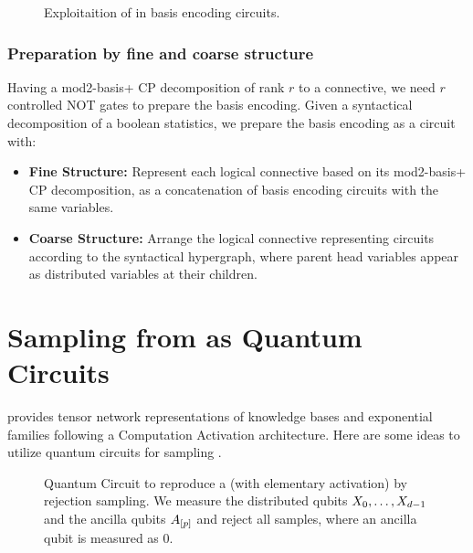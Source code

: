 \documentclass[aps,onecolumn,nofootinbib,pra]{article}
\begin{document}
    \begin{figure}
        \begin{center}
            
        \end{center}
        \caption{
           Exploitaition of \PolynomialSparsity{} in basis encoding circuits.
        }\label{fig:qcbencodingPolynomial}
    \end{figure}


    \subsubsection{Preparation by fine and coarse structure}

    Having a mod2-basis+ CP decomposition of rank $r$ to a connective, we need $r$ controlled NOT gates to prepare the basis encoding.
    Given a syntactical decomposition of a boolean statistics, we prepare the basis encoding as a circuit with:
    \begin{itemize}
        \item \textbf{Fine Structure:} Represent each logical connective based on its mod2-basis+ CP decomposition, as a concatenation of basis encoding circuits with the same variables.
        \item \textbf{Coarse Structure:} Arrange the logical connective representing circuits according to the syntactical hypergraph, where parent head variables appear as distributed variables at their children.
    \end{itemize}


    \section{Sampling from \ComputationActivationNetworks{} as Quantum Circuits}

    \tnreason{} provides tensor network representations of knowledge bases and exponential families following a Computation Activation architecture.
    Here are some ideas to utilize quantum circuits for sampling \ComputationActivationNetworks{}.

    \begin{figure}
        \begin{center}
            
        \end{center}
        \caption{
            Quantum Circuit to reproduce a \ComputationActivationNetwork{} (with elementary activation) by rejection sampling.
            We measure the distributed qubits $X_{0},\ldots,X_{d-1}$ and the ancilla qubits $A_{[p]}$ and reject all samples, where an ancilla qubit is measured as $0$.
        }
    \end{figure}
\end{document}
